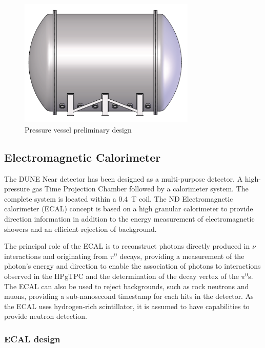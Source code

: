 \begin{figure}[ht]
\centering 
\includegraphics[width=0.75\textwidth]{graphics/tpc_pressurevessel.png} 
\caption{Pressure vessel preliminary design} 
\label{fig:TPC_PV} 
\end{figure}

\subsection{Electromagnetic Calorimeter}
The DUNE Near detector has been designed as a multi-purpose detector. A high-pressure gas Time Projection Chamber followed by a calorimeter system. The complete system is located within a \SI{0.4}{\tesla} coil. The ND Electromagnetic calorimeter (ECAL) concept is based on a high granular calorimeter to provide direction information in addition to the energy measurement of electromagnetic showers and an efficient rejection of background.

The principal role of the ECAL is to reconstruct photons directly produced in $\nu$ interactions and originating from $\pi^0$ decays, providing a measurement of the photon's energy and direction to enable the association of photons to interactions observed in the HPgTPC and the determination of the decay vertex of the $\pi^0$s. The ECAL can also be used to reject backgrounds, such as rock neutrons and muons, providing a sub-nanosecond timestamp \cite{Simon:2013zya} for each hits in the detector. As the ECAL uses hydrogen-rich scintillator, it is assumed to have capabilities to provide neutron detection.

\subsubsection{ECAL design}

